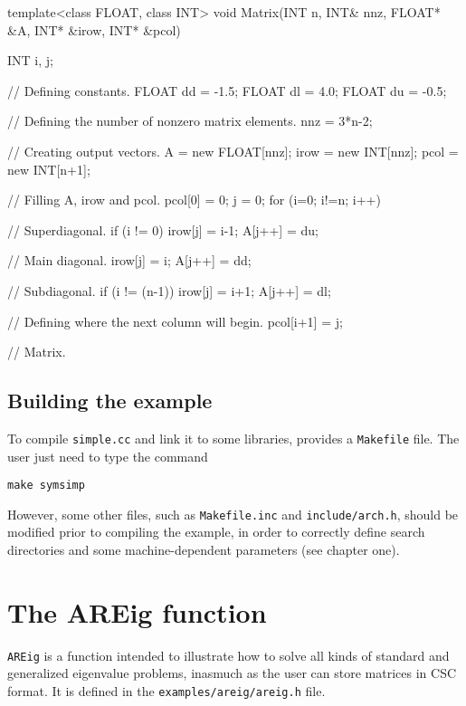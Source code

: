 \begin{cppcode}
template<class FLOAT, class INT>
void Matrix(INT n, INT& nnz, FLOAT* &A, INT* &irow, INT* &pcol)
{
	INT  i, j;

	// Defining constants.
	FLOAT dd = -1.5;
	FLOAT dl =  4.0;
	FLOAT du = -0.5;

	// Defining the number of nonzero matrix elements.
	nnz = 3*n-2;

	// Creating output vectors.
	A    = new FLOAT[nnz];
	irow = new INT[nnz];
	pcol = new INT[n+1];

	// Filling A, irow and pcol.
	pcol[0] = 0;
	j = 0;
	for (i=0; i!=n; i++) {

		// Superdiagonal.
		if (i != 0) {
			irow[j] = i-1;
			A[j++]  = du;
		}

		// Main diagonal.
		irow[j] = i;
		A[j++]  = dd;

		// Subdiagonal.
		if (i != (n-1)) {
			irow[j] = i+1;
			A[j++]  = dl;
		}

		// Defining where the next column will begin.
		pcol[i+1] = j;
	}
} // Matrix.
\end{cppcode}

\subsection{Building the example}

To compile \texttt{simple.cc} and link it to some libraries, \ARPP{} provides a \texttt{Makefile} file. The user just need to type the command
\begin{verbatim}
make symsimp
\end{verbatim}
However, some other files, such as \texttt{Makefile.inc} and \texttt{include/arch.h}, should be modified prior to compiling the example, in order to correctly define search directories and some machine-dependent parameters (see chapter one).

\section{The AREig function}

\texttt{AREig} is a function intended to illustrate how to solve all kinds of standard and generalized eigenvalue problems, inasmuch as the user can store matrices in CSC format. It is defined in the \texttt{examples/areig/areig.h} file.

